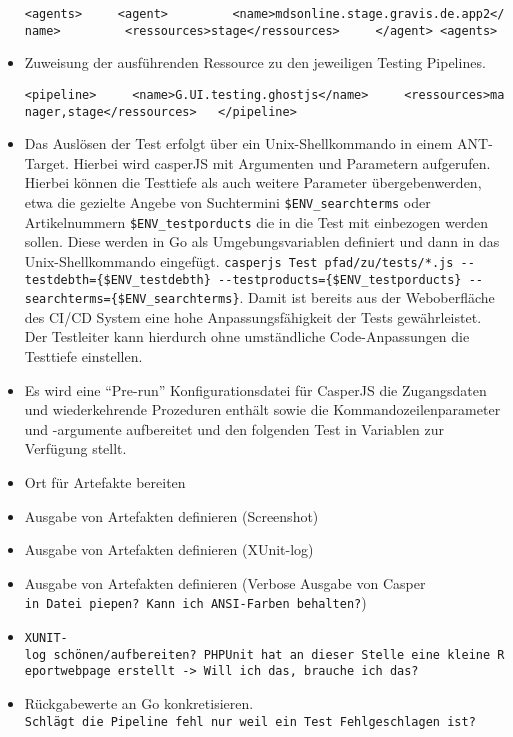 \begin{itemize}
  \texttt{\textless{}agents\textgreater{}\ \ \ \ \ \textless{}agent\textgreater{}\ \ \ \ \ \ \ \ \ \textless{}name\textgreater{}mdsonline.stage.gravis.de.app2\textless{}/name\textgreater{}\ \ \ \ \ \ \ \ \ \textless{}ressources\textgreater{}stage\textless{}/ressources\textgreater{}\ \ \ \ \ \textless{}/agent\textgreater{}\ \textless{}agents\textgreater{}}
\item
  Zuweisung der ausführenden Ressource zu den jeweiligen Testing
  Pipelines.

  \texttt{\textless{}pipeline\textgreater{}\ \ \ \ \ \textless{}name\textgreater{}G.UI.testing.ghostjs\textless{}/name\textgreater{}\ \ \ \ \ \textless{}ressources\textgreater{}manager,stage\textless{}/ressources\textgreater{}\ \ \ \textless{}/pipeline\textgreater{}}
\item
  Das Auslösen der Test erfolgt über ein Unix-Shellkommando in einem
  ANT-Target. Hierbei wird casperJS mit Argumenten und Parametern
  aufgerufen. Hierbei können die Testtiefe als auch weitere Parameter
  übergebenwerden, etwa die gezielte Angebe von Suchtermini
  \texttt{\$ENV\_searchterms} oder Artikelnummern
  \texttt{\$ENV\_testporducts} die in die Test mit einbezogen werden
  sollen. Diese werden in Go als Umgebungsvariablen definiert und dann
  in das Unix-Shellkommando eingefügt.
  \texttt{casperjs\ Test\ pfad/zu/tests/*.js\ -\/-testdebth=\{\$ENV\_testdebth\}\ -\/-testproducts=\{\$ENV\_testporducts\}\ -\/-searchterms=\{\$ENV\_searchterms\}}.
  Damit ist bereits aus der Weboberfläche des CI/CD System eine hohe
  Anpassungsfähigkeit der Tests gewährleistet. Der Testleiter kann
  hierdurch ohne umständliche Code-Anpassungen die Testtiefe einstellen.
\item
  Es wird eine ``Pre-run'' Konfigurationsdatei für CasperJS die
  Zugangsdaten und wiederkehrende Prozeduren enthält sowie die
  Kommandozeilenparameter und -argumente aufbereitet und den folgenden
  Test in Variablen zur Verfügung stellt.
\item
  Ort für Artefakte bereiten
\item
  Ausgabe von Artefakten definieren (Screenshot)
\item
  Ausgabe von Artefakten definieren (XUnit-log)
\item
  Ausgabe von Artefakten definieren (Verbose Ausgabe von Casper
  \texttt{in\ Datei\ piepen?\ Kann\ ich\ ANSI-Farben\ behalten?})
\item
  \texttt{XUNIT-log\ schönen/aufbereiten?\ PHPUnit\ hat\ an\ dieser\ Stelle\ eine\ kleine\ Reportwebpage\ erstellt\ -\textgreater{}\ Will\ ich\ das,\ brauche\ ich\ das?}
\item
  Rückgabewerte an Go konkretisieren.
  \texttt{Schlägt\ die\ Pipeline\ fehl\ nur\ weil\ ein\ Test\ Fehlgeschlagen\ ist?}
\end{itemize}
